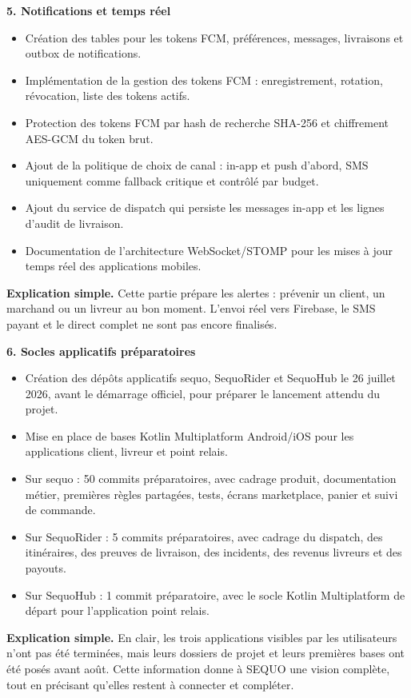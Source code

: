\documentclass[11pt,letterpaper]{article}
\newcommand{\subsectiontitle}[1]{%
  \vspace{0.35em}
  {\large\bfseries\color{SequoInk}#1}\par
}
\newcommand{\simpleexplanation}[1]{%
  {\small\textbf{\color{SequoBlue}Explication simple.} \color{SequoMuted}#1\par}
}
\begin{document}
\subsectiontitle{5. Notifications et temps réel}
\begin{itemize}
  \item Création des tables pour les tokens FCM, préférences, messages, livraisons et outbox de notifications.
  \item Implémentation de la gestion des tokens FCM : enregistrement, rotation, révocation, liste des tokens actifs.
  \item Protection des tokens FCM par hash de recherche SHA-256 et chiffrement AES-GCM du token brut.
  \item Ajout de la politique de choix de canal : in-app et push d'abord, SMS uniquement comme fallback critique et contrôlé par budget.
  \item Ajout du service de dispatch qui persiste les messages in-app et les lignes d'audit de livraison.
  \item Documentation de l'architecture WebSocket/STOMP pour les mises à jour temps réel des applications mobiles.
\end{itemize}
\simpleexplanation{Cette partie prépare les alertes : prévenir un client, un marchand ou un livreur au bon moment. L'envoi réel vers Firebase, le SMS payant et le direct complet ne sont pas encore finalisés.}

\subsectiontitle{6. Socles applicatifs préparatoires}
\begin{itemize}
  \item Création des dépôts applicatifs sequo, SequoRider et SequoHub le 26 juillet 2026, avant le démarrage officiel, pour préparer le lancement attendu du projet.
  \item Mise en place de bases Kotlin Multiplatform Android/iOS pour les applications client, livreur et point relais.
  \item Sur sequo : 50 commits préparatoires, avec cadrage produit, documentation métier, premières règles partagées, tests, écrans marketplace, panier et suivi de commande.
  \item Sur SequoRider : 5 commits préparatoires, avec cadrage du dispatch, des itinéraires, des preuves de livraison, des incidents, des revenus livreurs et des payouts.
  \item Sur SequoHub : 1 commit préparatoire, avec le socle Kotlin Multiplatform de départ pour l'application point relais.
\end{itemize}
\simpleexplanation{En clair, les trois applications visibles par les utilisateurs n'ont pas été terminées, mais leurs dossiers de projet et leurs premières bases ont été posés avant août. Cette information donne à SEQUO une vision complète, tout en précisant qu'elles restent à connecter et compléter.}
\end{document}
